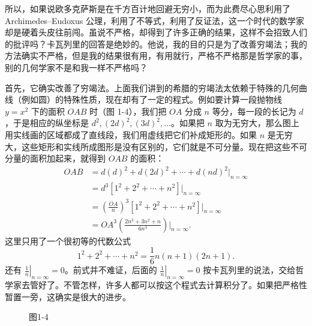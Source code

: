 所以，如果说欧多克萨斯是在千方百计地回避无穷小，而为此费尽心思利用了 Archimedes--Eudoxus 公理，利用了不等式，利用了反证法，这一个时代的数学家却是硬着头皮往前闯。虽说不严格，却得到了许多正确的结果，这样不会招致人们的批评吗？卡瓦列里的回答是绝妙的。他说，我的目的只是为了改善穷竭法；我的方法确实不严格，但是我的结果很有用，有用就行，严格不严格那是哲学家的事，别的几何学家不是和我一样不严格吗？

首先，它确实改善了穷竭法。上面我们讲到的希腊的穷竭法太依赖于特殊的几何曲线（例如圆）的特殊性质，现在却有了一定的程式。例如要计算一段抛物线 $y=x^2$ 下的面积 $OAB$ 时（图 1-4），我们把 $OA$ 分成 $n$ 等分，每一段的长记为 $d$，于是相应的纵坐标是 $d^2,(2d)^2,(3d)^2,\ldots$。如果把 $n$ 取为无穷大，那么图上用实线画的区域都成了直线段，我们用虚线把它们补成矩形的。如果 $n$ 是无穷大，这些矩形和实线所成图形是没有区别的，它们就是不可分量。现在把这些不可分量的面积加起来，就得到 $OAB$ 的面积：
\[
\begin{aligned}
OAB
&= d(d)^2+d(2d)^2+\cdots+d(nd)^2\big|_{n=\infty}\\
&=d^3[1^2+2^2+\cdots+n^2]\big|_{n=\infty}\\
&=\left(\frac{OA}{n}\right)^3[1^2+2^2+\cdots+n^2]\big|_{n=\infty}\\
&=OA^3\left(\frac{2n^3+3n^2+n}{6n^3}\right)\bigg|_{n=\infty}.
\end{aligned}
\]
这里只用了一个很初等的代数公式
\[
1^2+2^2+\cdots+n^2=\frac16 n(n+1)(2n+1).
\]
还有 $\left.\frac1n\right|_{n=\infty}=0$。前式并不难证，后面的 $\left.\frac1n\right|_{n=\infty}=0$ 按卡瓦列里的说法，交给哲学家去管好了。不管怎样，许多人都可以按这个程式去计算积分了。如果把严格性暂置一旁，这确实是很大的进步。

\begin{figure}[htbp]
\centering
{}
\caption*{图1-4}
\end{figure}

